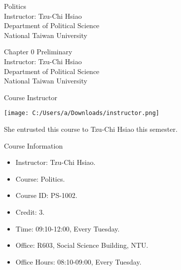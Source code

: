 \documentclass{beamer}
\title{}
\author{}
\date{}
\begin{document}
\begin{frame}
\begin{center}
\Large{Politics} \\
\vspace{3em}
\normalsize{Instructor: Tzu-Chi Hsiao} \\
\vspace{3em}
\small{Department of Political Science} \\
\vspace{1em}
\small{National Taiwan University}
\end{center}
\end{frame}
\begin{frame}
\begin{center}
\Large{Chapter 0 Preliminary} \\
\vspace{3em}
\normalsize{Instructor: Tzu-Chi Hsiao} \\
\vspace{3em}
\small{Department of Political Science} \\
\vspace{1em}
\small{National Taiwan University} \\
\end{center}
\end{frame}
\begin{frame}{Course Instructor}
\begin{center}
\texttt{[image: C:/Users/a/Downloads/instructor.png]}
\end{center}
\begin{center}
She entrusted this course to Tzu-Chi Hsiao this semester.
\end{center}
\end{frame}
\begin{frame}{Course Information}
\begin{itemize}
\pause
\item Instructor: Tzu-Chi Hsiao.
\pause
\item Course: Politics.
\pause
\item Course ID: PS-1002.
\pause
\item Credit: 3.
\pause
\item Time: 09:10-12:00, Every Tuesday.
\pause
\item Office: R603, Social Science Building, NTU.
\pause
\item Office Hours: 08:10-09:00, Every Tuesday.
\end{itemize}
\end{frame}
\end{document}
